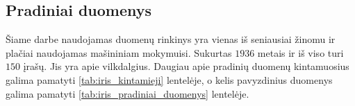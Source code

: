 \subsection{Pradiniai duomenys}
\label{subsec:pradiniai_duomenys}

Šiame darbe naudojamas duomenų rinkinys \cite{iris_53} yra vienas iš seniausiai žinomu ir plačiai naudojamas mašininiam mokymuisi. Sukurtas $1936$ metais ir iš viso turi $150$ įrašų. Jis yra apie vilkdalgius. Daugiau apie pradinių duomenų kintamuosius galima pamatyti \ref{tab:iris_kintamieji} lentelėje, o kelis pavyzdinius duomenys galima pamatyti \ref{tab:iris_pradiniai_duomenys} lentelėje.


